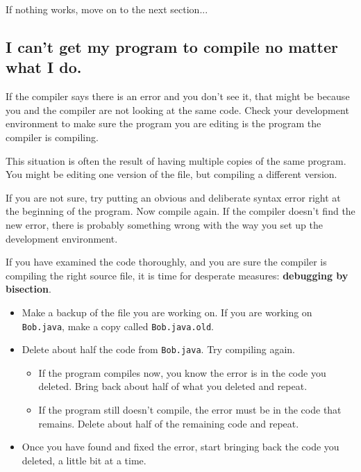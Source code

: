 \documentclass[12pt]{book}
\theoremstyle{exercise}
\begin{document}
If nothing works, move on to the next section...


\subsection*{I can't get my program to compile no matter what I do.}

If the compiler says there is an error and you don't see it, that might be because you and the compiler are not looking at the same code.
Check your development environment to make sure the program you are editing is the program the compiler is compiling.

This situation is often the result of having multiple copies of the same program.
You might be editing one version of the file, but compiling a different version.

If you are not sure, try putting an obvious and deliberate syntax error right at the beginning of the program.
Now compile again.
If the compiler doesn't find the new error, there is probably something wrong with the way you set up the development environment.

If you have examined the code thoroughly, and you are sure the compiler is compiling the right source file, it is time for desperate measures: {\bf debugging by bisection}.


\begin{itemize}

\item Make a backup of the file you are working on.
If you are working on {\tt Bob.java}, make a copy called {\tt Bob.java.old}.

\item Delete about half the code from {\tt Bob.java}.
Try compiling again.

\begin{itemize}

\item If the program compiles now, you know the error is in the code you deleted.
Bring back about half of what you deleted and repeat.

\item If the program still doesn't compile, the error must be in the code that remains.
Delete about half of the remaining code and repeat.

\end{itemize}

\item Once you have found and fixed the error, start bringing back the code you deleted, a little bit at a time.

\end{itemize}
\end{document}
